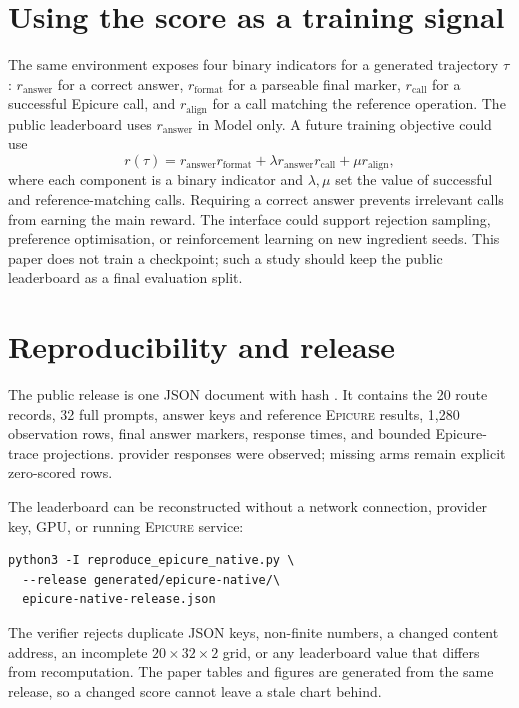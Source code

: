 \documentclass{article}
\newcommand{\epicure}{\textsc{Epicure}}
\begin{document}
\section{Using the score as a training signal}
\label{sec:training}

The same environment exposes four binary indicators for a generated trajectory $\tau$:
$r_{\mathrm{answer}}$ for a correct answer, $r_{\mathrm{format}}$ for a parseable final marker,
$r_{\mathrm{call}}$ for a successful Epicure call, and $r_{\mathrm{align}}$ for a call matching the
reference operation. The public leaderboard uses $r_{\mathrm{answer}}$ in Model only. A future
training objective could use
\begin{equation}
 r(\tau)=r_{\mathrm{answer}}r_{\mathrm{format}}
 +\lambda r_{\mathrm{answer}}r_{\mathrm{call}}
 +\mu r_{\mathrm{align}},
 \label{eq:reward}
\end{equation}
where each component is a binary indicator and $\lambda,\mu$ set the value of successful and
reference-matching calls. Requiring a correct answer prevents irrelevant calls from earning the
main reward. The interface could support rejection sampling, preference optimisation, or
reinforcement learning on new ingredient seeds. This paper does not train a checkpoint; such a
study should keep the public leaderboard as a final evaluation split.

\section{Reproducibility and release}
\label{sec:reproduction}

The public release is one JSON document with hash \FBReleaseSHA{}. It contains the 20 route records,
32 full prompts, answer keys and reference \epicure{} results, 1,280 observation rows, final answer
markers, response times, and bounded Epicure-trace projections. \FBObservedArms{} provider responses
were observed; \FBMissingArms{} missing arms remain explicit zero-scored rows.

The leaderboard can be reconstructed without a network connection, provider key, GPU, or running
\epicure{} service:

\begin{verbatim}
python3 -I reproduce_epicure_native.py \
  --release generated/epicure-native/\
  epicure-native-release.json
\end{verbatim}

The verifier rejects duplicate JSON keys, non-finite numbers, a changed content address, an
incomplete $20\times32\times2$ grid, or any leaderboard value that differs from recomputation. The
paper tables and figures are generated from the same release, so a changed score cannot leave a
stale chart behind.
\end{document}
